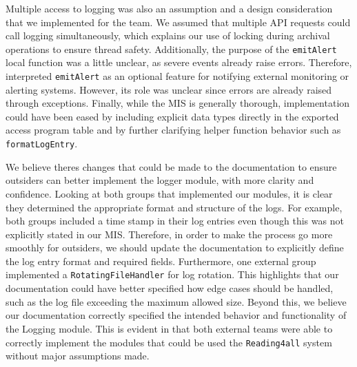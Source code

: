 \documentclass[12pt, titlepage]{article}
\begin{document}
\begin{enumerate}
    Multiple access to logging was also an assumption and a design consideration that we implemented for the team. We assumed that multiple 
    API requests could call logging simultaneously, which explains our use of locking during archival operations to ensure 
    thread safety. Additionally, the purpose of the \texttt{emitAlert} local function was a little unclear, as severe events already 
    raise errors. Therefore, interpreted \texttt{emitAlert} as an optional feature for notifying external monitoring or alerting systems. 
    However, its role was unclear since errors are already raised through exceptions. Finally, while the MIS is generally thorough, 
    implementation could have been eased by including explicit data types directly in the exported access program table and by 
    further clarifying helper function behavior such as \texttt{formatLogEntry}. 

    We believe theres changes that could be made to the documentation to ensure outsiders can better implement the logger module, with more clarity
    and confidence. Looking at both groups that implemented our modules, it is clear they determined the appropriate format and structure
    of the logs. For example, both groups included a time stamp in their log entries even though this was not explicitly stated in our MIS. Therefore, in order 
    to make the process go more smoothly for outsiders, we should update the documentation to explicitly define the log entry format and required fields. 
    Furthermore, one external group implemented a \texttt{RotatingFileHandler} for log rotation. This highlights that our documentation could have better specified how
    edge cases should be handled, such as the log file exceeding the maximum allowed size. 
    Beyond this, we believe our documentation correctly specified the intended behavior and functionality of the Logging module.
    This is evident in that both external teams were able to correctly implement the modules that could be used the 
    \texttt{Reading4all} system without major assumptions made.
    


  
\end{enumerate}
\end{document}
